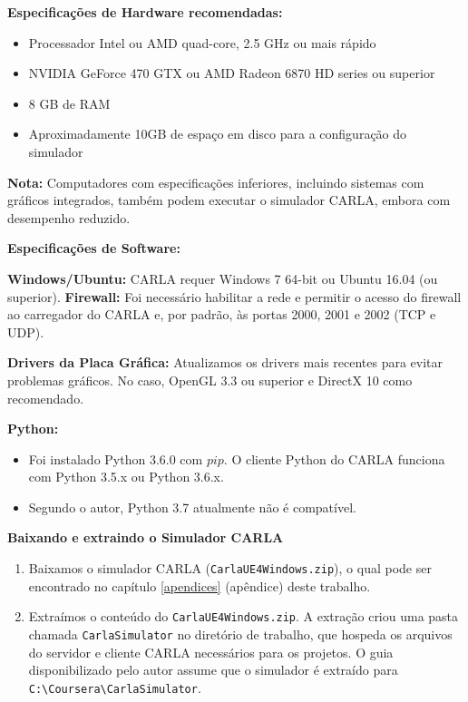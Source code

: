 \textbf{Especificações de Hardware recomendadas:}
\begin{itemize}
  \item Processador Intel ou AMD quad-core, 2.5 GHz ou mais rápido
  \item NVIDIA GeForce 470 GTX ou AMD Radeon 6870 HD series ou superior
  \item 8 GB de RAM
  \item Aproximadamente 10GB de espaço em disco para a configuração do simulador
\end{itemize}

\textbf{Nota:} Computadores com especificações inferiores, incluindo sistemas com gráficos integrados, também podem executar o simulador CARLA, embora com desempenho reduzido.

\textbf{Especificações de Software:}

\textbf{Windows/Ubuntu:}
 CARLA requer Windows 7 64-bit ou Ubuntu 16.04 (ou superior).
\textbf{Firewall:}
 Foi necessário habilitar a rede e permitir o acesso do firewall ao carregador do CARLA e, por padrão, às portas 2000, 2001 e 2002 (TCP e UDP).

\textbf{Drivers da Placa Gráfica:}
Atualizamos os drivers mais recentes para evitar problemas gráficos. No caso, OpenGL 3.3 ou superior e DirectX 10 como recomendado.

\textbf{Python:}
\begin{itemize}
  \item Foi instalado Python 3.6.0 com $\textit{pip}$. O cliente Python do CARLA funciona com Python 3.5.x ou Python 3.6.x.
  \item Segundo o autor, Python 3.7 atualmente não é compatível.
  \end{itemize}

\textbf{Baixando e extraindo o Simulador CARLA}
\begin{enumerate}
  \item Baixamos o simulador CARLA (\texttt{CarlaUE4Windows.zip}), o qual pode ser encontrado no capítulo \ref{apendices} (apêndice) deste trabalho. 
  \item Extraímos o conteúdo do \texttt{CarlaUE4Windows.zip}. A extração criou uma pasta chamada \texttt{CarlaSimulator} no diretório de trabalho, que hospeda os arquivos do servidor e cliente CARLA necessários para os projetos. O guia disponibilizado pelo autor \cite{University_of_Toronto2018-fe} assume que o simulador é extraído para \texttt{C:\textbackslash Coursera\textbackslash CarlaSimulator}. \end{enumerate}

